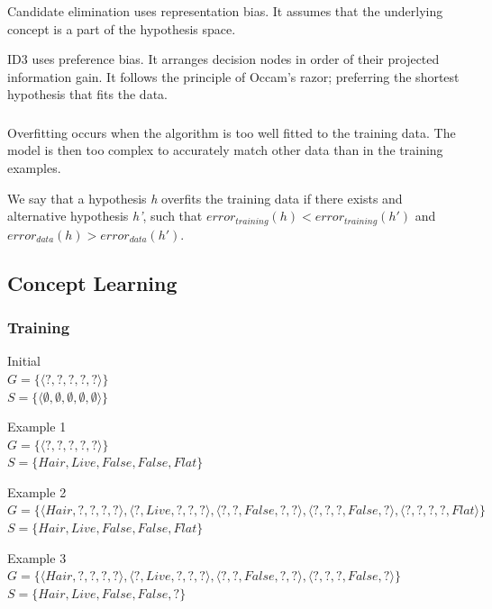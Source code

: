 \documentclass{article}
\begin{document}
Candidate elimination uses representation bias. It assumes that the underlying concept is a part of the hypothesis space.

ID3 uses preference bias. It arranges decision nodes in order of their projected information gain. It follows the principle of Occam's razor; preferring the shortest hypothesis that fits the data.

\subsubsection{}
Overfitting occurs when the algorithm is too well fitted to the training data. The model is then too complex to accurately match other data than in the training examples.

We say that a hypothesis \textit{h} overfits the training data if there exists and alternative hypothesis \textit{h'}, such that $error_{training}(h)<error_{training}(h')$ and $error_{data}(h)>error_{data}(h')$.

\subsection{Concept Learning}

\subsubsection{}

\subsubsection*{Training}
Initial \\
$G=\{\langle ?, ?, ?, ?, ? \rangle\}$ \\
$S=\{\langle \emptyset, \emptyset, \emptyset, \emptyset, \emptyset \rangle\}$

Example 1 \\
$G=\{\langle ?, ?, ?, ?, ? \rangle\}$ \\
$S=\{ Hair, Live, False, False, Flat \}$

Example 2 \\
$G=\{\langle Hair, ?, ?, ?, ? \rangle, \langle ?, Live, ?, ?, ? \rangle, \langle ?, ?, False, ?, ? \rangle, \langle ?, ?, ?, False, ? \rangle, \langle ?, ?, ?, ?, Flat \rangle\}$ \\
$S=\{ Hair, Live, False, False, Flat \}$

Example 3 \\
$G=\{\langle Hair, ?, ?, ?, ? \rangle, \langle ?, Live, ?, ?, ? \rangle, \langle ?, ?, False, ?, ? \rangle, \langle ?, ?, ?, False, ? \rangle\}$ \\
$S=\{ Hair, Live, False, False, ? \}$
\end{document}
